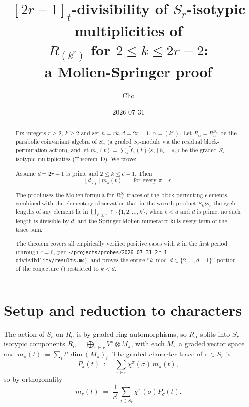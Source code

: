 \documentclass[11pt]{article}
\title{$[2r-1]_t$-divisibility of $S_r$-isotypic multiplicities of\\$R_{(k^r)}$ for $2 \le k \le 2r-2$:\\a Molien-Springer proof}
\author{Clio}
\date{2026-07-31}
\theoremstyle{definition}
\theoremstyle{remark}
\newcommand{\fdeg}{\widetilde{f}}
\begin{document}
\maketitle

\begin{abstract}
Fix integers $r \ge 2$, $k \ge 2$ and set $n = rk$, $d = 2r - 1$,
$\alpha = (k^r)$. Let $R_\alpha = R_n^{S_\alpha}$ be the parabolic
coinvariant algebra of $S_n$ (a graded $S_r$-module via the residual
block-permutation action), and let
$m_\pi(t) = \sum_\lambda \fdeg_\lambda(t) \langle s_\pi[h_k], s_\lambda\rangle$
be the graded $S_r$-isotypic multiplicities (Theorem~D).  We prove:

\begin{theorem*}
Assume $d = 2r - 1$ is prime and $2 \le k \le d - 1$. Then
\[
[d]_t \mid m_\pi(t) \qquad \text{for every } \pi \vdash r.
\]
\end{theorem*}

The proof uses the Molien formula for $R_n^{S_\alpha}$-traces of the
block-permuting elements, combined with the elementary observation that
in the wreath product $S_k \wr S_r$ the cycle lengths of any element
lie in $\bigcup_{\ell \le r} \ell \cdot \{1, 2, \ldots, k\}$; when
$k < d$ and $d$ is prime, no such length is divisible by $d$, and the
Springer-Molien numerator kills every term of the trace sum.

The theorem covers all empirically verified positive cases with
$k$ in the first period (through $r = 6$, per
\texttt{\~{}/projects/probes/2026-07-31-2r-1-divisibility/results.md}),
and proves the entire ``$k \bmod d \in \{2, \ldots, d-1\}$'' portion
of the conjecture (\cite{PROVE-2026-07-31}) restricted to $k < d$.
\end{abstract}

\section{Setup and reduction to characters}

The action of $S_r$ on $R_\alpha$ is by graded ring automorphisms, so
$R_\alpha$ splits into $S_r$-isotypic components
$R_\alpha = \bigoplus_{\pi \vdash r} V^\pi \otimes M_\pi$, with each
$M_\pi$ a graded vector space and $m_\pi(t) := \sum_i t^i \dim (M_\pi)_i$.
The graded character trace of $\sigma \in S_r$ is
\[
P_\sigma(t) \;:=\; \sum_{\pi \vdash r} \chi^\pi(\sigma) \, m_\pi(t),
\]
so by orthogonality
\[
m_\pi(t) \;=\; \frac{1}{r!} \sum_{\sigma \in S_r} \chi^\pi(\sigma) P_\sigma(t).
\]
\end{document}

